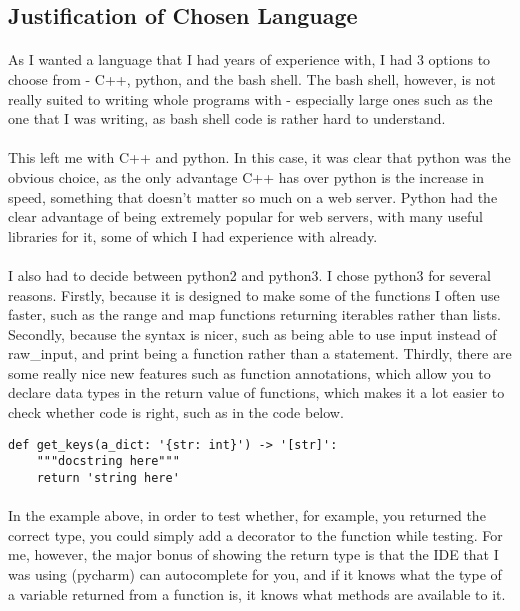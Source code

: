 \subsection{Justification of Chosen Language}
\paragraph{}
As I wanted a language that I had years of experience with, I had 3 options to choose from - C++, python, and the bash shell. The bash shell, however, is not really suited to writing whole programs with - especially large ones such as the one that I was writing, as bash shell code is rather hard to understand.

\paragraph{}
This left me with C++ and python. In this case, it was clear that python was the obvious choice, as the only advantage C++ has over python is the increase in speed, something that doesn't matter so much on a web server. Python had the clear advantage of being extremely popular for web servers, with many useful libraries for it, some of which I had experience with already.

\paragraph{}
I also had to decide between python2 and python3. I chose python3 for several reasons. Firstly, because it is designed to make some of the functions I often use faster, such as the range and map functions returning iterables rather than lists. Secondly, because the syntax is nicer, such as being able to use input instead of raw\_input, and print being a function rather than a statement. Thirdly, there are some really nice new features such as function annotations, which allow you to declare data types in the return value of functions, which makes it a lot easier to check whether code is right, such as in the code below.

\begin{verbatim}
def get_keys(a_dict: '{str: int}') -> '[str]':
    """docstring here"""
    return 'string here'
\end{verbatim}

\paragraph{}
In the example above, in order to test whether, for example, you returned the correct type, you could simply add a decorator to the function while testing. For me, however, the major bonus of showing the return type is that the IDE that I was using (pycharm) can autocomplete for you, and if it knows what the type of a variable returned from a function is, it knows what methods are available to it.